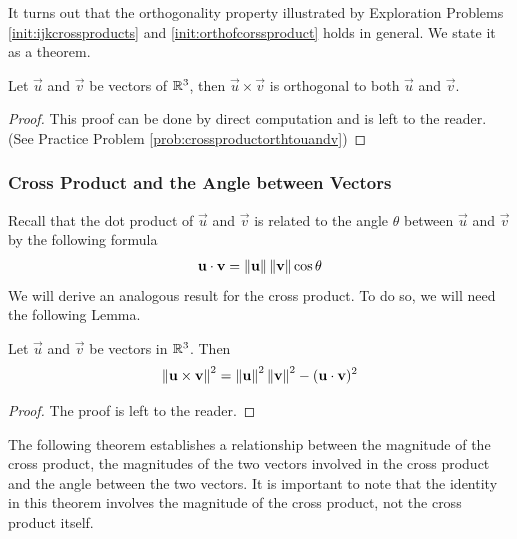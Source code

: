 \documentclass{ximera}
\begin{document}
It turns out that the orthogonality property illustrated by Exploration Problems \ref{init:ijkcrossproducts} and \ref{init:orthofcorssproduct}  holds in general.  We state it as a theorem.

\begin{theorem}\label{th:crossproductorthtouandv}
Let $\vec{u}$ and $\vec{v}$ be vectors of $\mathbb{R}^3$, then $\vec{u}\times\vec{v}$ is orthogonal to both $\vec{u}$ and $\vec{v}$.
\end{theorem}
\begin{proof}This proof can be done by direct computation and is left to the reader.  (See Practice Problem \ref{prob:crossproductorthtouandv})
\end{proof}

\subsubsection*{Cross Product and the Angle between Vectors}
Recall that the dot product of $\vec{u}$ and $\vec{v}$ is related to the angle $\theta$ between $\vec{u}$ and $\vec{v}$ by the following formula
\begin{align}\label{eq:dotproductformula}\mathbf{u}\cdot\mathbf{v}=\left\lVert\mathbf{u}\right\rVert\left\lVert\mathbf{v}\right\rVert\cos\theta\end{align}
We will derive an analogous result for the cross product.  To do so, we will need the following Lemma.

\begin{lemma}\label{lemma:crossprodmagnitude}
Let $\vec{u}$ and $\vec{v}$ be vectors in $\mathbb{R}^3$.  Then
$$\left\lVert\mathbf{u}\times\mathbf{v}\right\rVert^2=\left\lVert\mathbf{u}\right\rVert^2\left\lVert\mathbf{v}\right\rVert^2-(\mathbf{u}\cdot\mathbf{v})^2$$
\end{lemma}
\begin{proof} The proof is left to the reader.  %
\end{proof}

The following theorem establishes a relationship between the magnitude of the cross product, the magnitudes of the two vectors involved in the cross product and the angle between the two vectors.  It is important to note that  the identity in this theorem involves the magnitude of the cross product, not the cross product itself.
\end{document}
